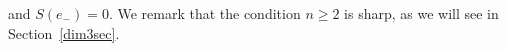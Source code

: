 \documentclass[11pt,a4paper]{amsart}
\newcommand{\p}{\mathfrak{p}}
\newcommand{\g}{\mathfrak{g}}
\newcommand{\h}{\mathfrak{h}}
\newcommand{\+}{\oplus}
\newcommand{\1}{\mathbf{1}}
\newcommand{\R}{\mathbb{R}} %
\newcommand{\<}{\langle}
\renewcommand{\>}{\rangle}
\theoremstyle{definition}
\newtheorem{example}[definition]{Example}
\theoremstyle{plain}
\numberwithin{equation}{section}
\begin{document}
and $ S(e_-)=0$.
We  remark that 
 the condition $n\ge 2$ is sharp, as we will see in Section~\ref{dim3sec}.
\end{document}
